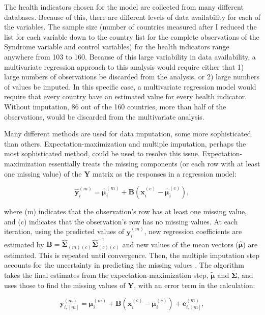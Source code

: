 The health indicators chosen for the model are collected from many different databases. Because of this, there are different levels of data availability for each of the variables. The sample size (number of countries measured after I reduced the list for each variable down to the country list for the complete observations of the Syndrome variable and control variables) for the health indicators range anywhere from 103 to 160. Because of this large variability in data availability, a multivariate regression approach to this analysis would require either that 1) large numbers of observations be discarded from the analysis, or 2) large numbers of values be imputed. In this specific case, a multivariate regression model would require that every country have an estimated value for every health indicator. Without imputation, 86 out of the 160 countries, more than half of the observations, would be discarded from the multivariate analysis. 

Many different methods are used for data imputation, some more sophisticated than others. Expectation-maximization and multiple imputation, perhaps the most sophisticated method, could be used to resolve this issue. Expectation-maximization essentially treats the missing components (or each row with at least one missing value) of the $\mathbf{Y}$ matrix as the responses in a regression model:

\begin{equation}
\hat{\mathbf{y}}_i^{(m)} = \hat{\boldsymbol{\mu}}_i^{(m)} + \mathbf{B} (\mathbf{x}_i^{(c)} - \hat{\boldsymbol{\mu}}_i^{(c)}),
\end{equation}

where (m) indicates that the observation's row has at least one missing value, and (c) indicates that the observation's row has no missing values. At each iteration, using the predicted values of $\mathbf{y}_i^{(m)}$, new regression coefficients are estimated by $\mathbf{B}=\hat{\boldsymbol{\Sigma}}_{(m)(c)}\hat{\boldsymbol{\Sigma}}_{(c)(c)}^{-1}$ and new values of the mean vectors ($\hat{\boldsymbol{\mu}}$) are estimated. This is repeated until convergence. Then, the multiple imputation step accounts for the uncertainty in predicting the missing values \citep{Rencher}. The algorithm takes the final estimates from the expectation-maximization step, $\tilde{\boldsymbol{\mu}}$ and $\tilde{\boldsymbol{\Sigma}}$, and uses those to find the missing values of $\mathbf{Y}$, with an error term in the calculation:

\begin{equation}
\mathbf{y}_{i,[m]}^{(m)} = \boldsymbol{\mu}_i^{(m)} + \mathbf{B} (\mathbf{x}_i^{(c)} - \boldsymbol{\mu}_i^{(c)}) + \mathbf{e}_{i,[m]}^{(m)},
\end{equation}

